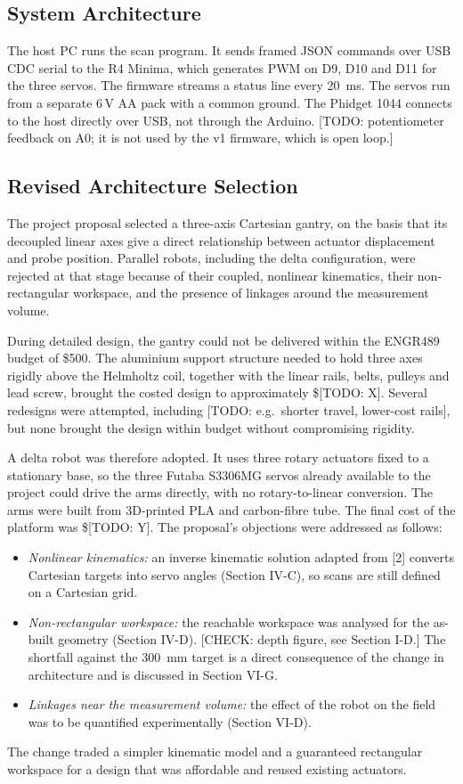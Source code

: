 \documentclass[conference]{IEEEtran}
\begin{document}
\subsection{System Architecture}
The host PC runs the scan program. It sends framed JSON commands over USB CDC serial
to the R4 Minima, which generates PWM on D9, D10 and D11 for the three servos. The
firmware streams a status line every \SI{20}{ms}. The servos run from a separate 6\,V
AA pack with a common ground. The Phidget 1044 connects to the host directly over USB,
not through the Arduino. [TODO: potentiometer feedback on A0; it is not used by the v1
firmware, which is open loop.]

\subsection{Revised Architecture Selection}
The project proposal selected a three-axis Cartesian gantry, on the basis that its
decoupled linear axes give a direct relationship between actuator displacement and
probe position. Parallel robots, including the delta configuration, were rejected at
that stage because of their coupled, nonlinear kinematics, their non-rectangular
workspace, and the presence of linkages around the measurement volume.

During detailed design, the gantry could not be delivered within the ENGR489 budget of
\$500. The aluminium support structure needed to hold three axes rigidly above the
Helmholtz coil, together with the linear rails, belts, pulleys and lead screw, brought
the costed design to approximately \$[TODO: X]. Several redesigns were attempted,
including [TODO: e.g.\ shorter travel, lower-cost rails], but none brought the design
within budget without compromising rigidity.

A delta robot was therefore adopted. It uses three rotary actuators fixed to a
stationary base, so the three Futaba S3306MG servos already available to the project
could drive the arms directly, with no rotary-to-linear conversion. The arms were
built from 3D-printed PLA and carbon-fibre tube. The final cost of the platform was
\$[TODO: Y]. The proposal's objections were addressed as follows:
\begin{itemize}
\item \emph{Nonlinear kinematics:} an inverse kinematic solution adapted from [2]
converts Cartesian targets into servo angles (Section IV-C), so scans are still
defined on a Cartesian grid.
\item \emph{Non-rectangular workspace:} the reachable workspace was analysed for the
as-built geometry (Section IV-D). [CHECK: depth figure, see Section I-D.] The shortfall
against the \SI{300}{mm} target is a direct consequence of the change in architecture
and is discussed in Section VI-G.
\item \emph{Linkages near the measurement volume:} the effect of the robot on the field
was to be quantified experimentally (Section VI-D).
\end{itemize}
The change traded a simpler kinematic model and a guaranteed rectangular workspace for
a design that was affordable and reused existing actuators.
\end{document}
